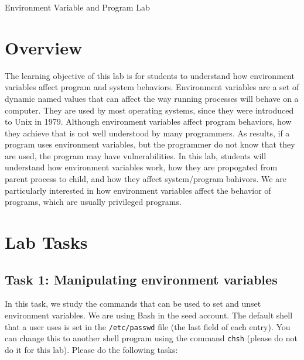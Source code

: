 








\begin{center}
{\LARGE Environment Variable and \setuid Program Lab}
\end{center}

\copyrightnotice


\section{Overview}

The learning objective of this lab is for students to understand how
environment variables affect program and system behaviors. Environment
variables are a set of dynamic named values that can affect the way running processes
will behave on a computer. They are used by most operating systems, since
they were introduced to Unix in 1979. Although environment variables affect
program behaviors, how they achieve that is not well understood by many
programmers. As results, if a program uses  environment
variables,  but the programmer do not know that they are used, the program
may have vulnerabilities. In this lab, students will understand how
environment variables work, how they are propogated from parent process to
child, and how they affect system/program bahivors. We are particularly
interested in how environment variables affect the behavior of \setuid
programs, which are usually privileged programs. 



\section{Lab Tasks}

\subsection{Task 1: Manipulating environment variables}

In this task, we study the commands that can be used to set and unset
environment variables. We are using Bash in the seed account. The default
shell that a user uses is set in  the {\tt /etc/passwd} file (the last
field of each entry). You can change this to another shell program using
the command {\tt chsh} (please do not do it for this lab). Please 
do the following tasks:

